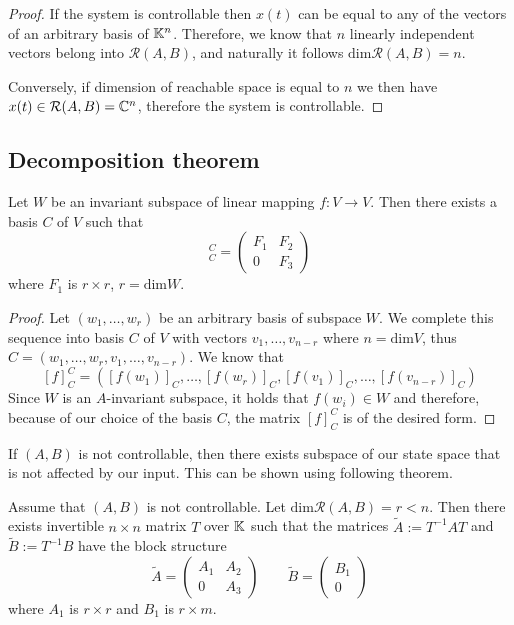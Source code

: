 \begin{proof}
	If the system is controllable then $x(t)$ can be equal to any of the vectors of an arbitrary basis of $\mathbb{K}^n$. Therefore, we know that $n$ linearly independent vectors belong into $\mathcal{R}(A,B)$, and naturally it follows $\text{dim}\mathcal{R}(A,B)=n$.

	Conversely, if dimension of reachable space is equal to $n$ we then have $x(t)\in\mathcal{R}(A,B)=\mathbb{C}^n$, therefore the system is controllable.
\end{proof}

\subsection{Decomposition theorem}

\begin{lemma}
	\label{lem:invsubspc}
	Let $W$ be an invariant subspace of linear mapping $f\colon V \rightarrow V$. Then there exists a basis $C$ of $V$ such that 
	\begin{equation*}
		[f]^C_C=
		\begin{pmatrix}
			F_1 & F_2 \\
			0   & F_3 
		\end{pmatrix}
	\end{equation*}
	where $F_1$ is $r\times r$, $r=\text{dim}W$.
\end{lemma}

\begin{proof}
	Let $(w_1,\ldots,w_r)$ be an arbitrary basis of subspace $W$. We complete this sequence into basis $C$ of $V$ with vectors $v_1,\ldots,v_{n-r}$ where $n=\text{dim}V$, thus $C=(w_1,\ldots,w_r,v_1,\ldots,v_{n-r})$. We know that $$[f]^C_C=([f(w_1)]_C,\ldots,[f(w_r)]_C,[f(v_1)]_C,\ldots,[f(v_{n-r})]_C)$$ Since $W$ is an $A$-invariant subspace, it holds that $f(w_i)\in W$ and therefore, because of our choice of the basis $C$, the matrix $[f]^C_C$ is of the desired form.
\end{proof}

If $(A,B)$ is not controllable, then there exists subspace of our state space that is not affected by our input. This can be shown using following theorem.

\begin{theorem}
	\label{theorem:decomp}
	Assume that $(A,B)$ is not controllable. Let $\text{dim}\mathcal{R}(A,B)=r<n$. Then there exists invertible $n\times n$ matrix $T$ over $\mathbb{K}$ such that the matrices $\widetilde{A}:=T^{-1}AT$ and $\widetilde{B}:=T^{-1}B$ have the block structure 
	\begin{equation*}
		\widetilde{A}=
		\begin{pmatrix}
			A_1 & A_2 \\
			0   & A_3 
		\end{pmatrix}
		\qquad
		\widetilde{B}=
		\begin{pmatrix}
			B_1  \\
			0
		\end{pmatrix}
	\end{equation*}
	where $A_1$ is $r \times r$ and $B_1$ is $r \times m$.
\end{theorem}

